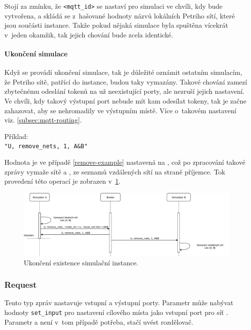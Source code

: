 Stojí za zmínku, že \texttt{<mqtt\_id>} se nastaví pro simulaci ve chvíli, kdy bude vytvořena, a skládá se z~hašované hodnoty názvů lokálních Petriho sítí, které jsou součásti instance. Takže pokud nějaká simulace byla spuštěna vícekrát v~jeden okamžik, tak jejich chování bude zcela identické.

\paragraph{Ukončení simulace}

Když se provádí ukončení simulace, tak je důležité oznámit ostatním simulacím, že Petriho sítě, patřící do instance, budou taky vymazány. Takové chování zamezí zbytečnému odeslání tokenů na už neexistující porty, ale nezruší jejich nastavení. Ve chvíli, kdy takový výstupní port nebude mít kam odesílat tokeny, tak je začne zahazovat, aby se nehromadily ve výstupním místě. Více o~takovém nastavení viz. \ref{subsec:mqtt-routing}.

\begin{tabbing}
  \label{remove-example}
  Příklad: \= \\
  \>\texttt{"U, remove\_nets, 1, A\&B"}
\end{tabbing}

Hodnota  je ve případě \ref{remove-example} nastavená na , což po zpracování takové zprávy vymaže sítě  a , ze seznamů vzdálených sítí na straně příjemce. Tok provedení této operací je zobrazen v~\ref{sim-unregister-viz}.

\begin{figure}[hbt]
  \centering
  \includegraphics[width=1\textwidth]{obrazky-figures/sim-unregister.pdf}
  \caption{Ukončení existence simulační instance.}
  \label{sim-unregister-viz}
\end{figure}

\subsubsection{Request} \label{par:request} Tento typ zpráv nastavuje vstupní a výstupní porty. Parametr  může nabývat hodnoty \texttt{set\_input} pro nastavení cílového místa  jako vstupní port pro síť . Parametr  a  není v~tom případě potřeba, stačí uvést rozdělovač.

